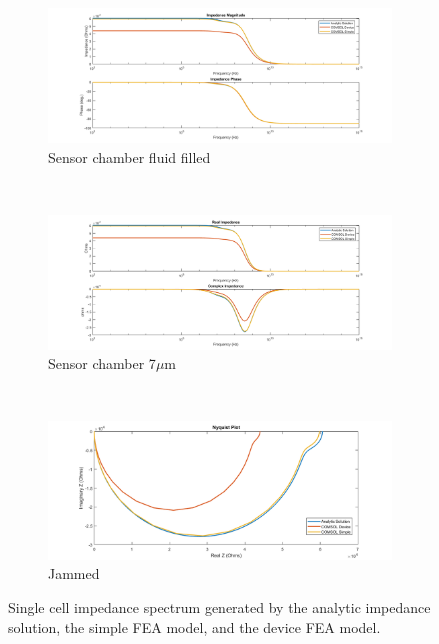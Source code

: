 \begin{figure}[h]
    \centering
    \begin{subfigure}[b]{\textwidth}
        \centering
        \includegraphics[width=\textwidth]{images/IS_model_mag_phase.png}
        \caption{Sensor chamber fluid filled}
    \end{subfigure}
    \\
    \vspace{0.1 in}
    \begin{subfigure}[b]{\textwidth}
        \centering
        \includegraphics[width=\textwidth]{images/IS_model_real_imag.png}
        \caption{Sensor chamber 7$\mu$m }
    \end{subfigure}
    \\
    \vspace{0.1 in}
    \begin{subfigure}[b]{\textwidth}
        \centering
        \includegraphics[width=\textwidth]{images/IS_model_nyquist.png}
        \caption{Jammed}
    \end{subfigure}
    \caption[Analyitic and FEA generated single cell impedance spectrums]{Single cell impedance spectrum generated by the analytic impedance solution, the simple FEA model, and the device FEA model.}
    \label{fig:single_cell_model_IS_data}
\end{figure}

